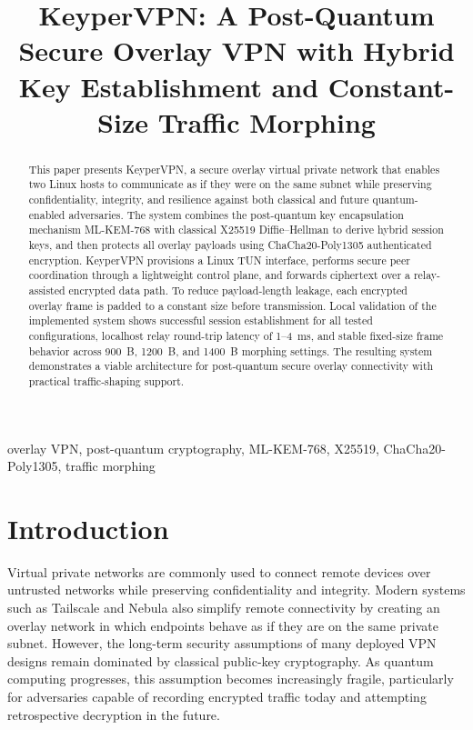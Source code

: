 \documentclass[conference]{IEEEtran}
\title{KeyperVPN: A Post-Quantum Secure Overlay VPN with Hybrid Key Establishment and Constant-Size Traffic Morphing}
\author{
\IEEEauthorblockN{Adith Biju, Adwait Mishra, Aryan Sharma}
\IEEEauthorblockA{
School of Computer Science and Engineering (SCOPE)\\
Vellore Institute of Technology\\
Chennai, IN\\
adith.kkb2005@gmail.com, mishraadwait456@gmail.com, aryansharma2k4@gmail.com
}
}
\begin{document}
\maketitle

\begin{abstract}
This paper presents KeyperVPN, a secure overlay virtual private network that enables two Linux hosts to communicate as if they were on the same subnet while preserving confidentiality, integrity, and resilience against both classical and future quantum-enabled adversaries. The system combines the post-quantum key encapsulation mechanism ML-KEM-768 with classical X25519 Diffie--Hellman to derive hybrid session keys, and then protects all overlay payloads using ChaCha20-Poly1305 authenticated encryption. KeyperVPN provisions a Linux TUN interface, performs secure peer coordination through a lightweight control plane, and forwards ciphertext over a relay-assisted encrypted data path. To reduce payload-length leakage, each encrypted overlay frame is padded to a constant size before transmission. Local validation of the implemented system shows successful session establishment for all tested configurations, localhost relay round-trip latency of 1--4~ms, and stable fixed-size frame behavior across 900~B, 1200~B, and 1400~B morphing settings. The resulting system demonstrates a viable architecture for post-quantum secure overlay connectivity with practical traffic-shaping support.
\end{abstract}

\begin{IEEEkeywords}
overlay VPN, post-quantum cryptography, ML-KEM-768, X25519, ChaCha20-Poly1305, traffic morphing
\end{IEEEkeywords}

\section{Introduction}
Virtual private networks are commonly used to connect remote devices over untrusted networks while preserving confidentiality and integrity. Modern systems such as Tailscale and Nebula also simplify remote connectivity by creating an overlay network in which endpoints behave as if they are on the same private subnet. However, the long-term security assumptions of many deployed VPN designs remain dominated by classical public-key cryptography. As quantum computing progresses, this assumption becomes increasingly fragile, particularly for adversaries capable of recording encrypted traffic today and attempting retrospective decryption in the future.
\end{document}
